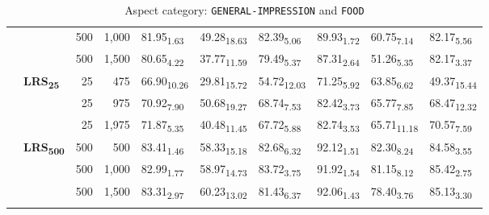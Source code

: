 \begin{table}[H]
\begin{subtable}{\linewidth}
{\begin{tabular}{llrrllllll}
 &  & 500 & 1,000 & 81.95\textsubscript{1.63} & 49.28\textsubscript{18.63} & 82.39\textsubscript{5.06} & 89.93\textsubscript{1.72} & 60.75\textsubscript{7.14} & 82.17\textsubscript{5.56} \\
 &  & 500 & 1,500 & 80.65\textsubscript{4.22} & 37.77\textsubscript{11.59} & 79.49\textsubscript{5.37} & 87.31\textsubscript{2.64} & 51.26\textsubscript{5.35} & 82.17\textsubscript{3.37} \\
\arrayrulecolor{gray}\cline{2-10}\arrayrulecolor{black}
\hline
\multirow{6}{*}{\textbf{GPT-3.5-turbo}} & \multirow{3}{*}{\textbf{LRS\textsubscript{25}}} & 25 & 475 & 66.90\textsubscript{10.26} & 29.81\textsubscript{15.72} & 54.72\textsubscript{12.03} & 71.25\textsubscript{5.92} & 63.85\textsubscript{6.62} & 49.37\textsubscript{15.44} \\
 &  & 25 & 975 & 70.92\textsubscript{7.90} & 50.68\textsubscript{19.27} & 68.74\textsubscript{7.53} & 82.42\textsubscript{3.73} & 65.77\textsubscript{7.85} & 68.47\textsubscript{12.32} \\
 &  & 25 & 1,975 & 71.87\textsubscript{5.35} & 40.48\textsubscript{11.45} & 67.72\textsubscript{5.88} & 82.74\textsubscript{3.53} & 65.71\textsubscript{11.18} & 70.57\textsubscript{7.59} \\
\arrayrulecolor{gray}\cline{2-10}\arrayrulecolor{black}
 & \multirow{3}{*}{\textbf{LRS\textsubscript{500}}} & 500 & 500 & 83.41\textsubscript{1.46} & 58.33\textsubscript{15.18} & 82.68\textsubscript{6.32} & 92.12\textsubscript{1.51} & 82.30\textsubscript{8.24} & 84.58\textsubscript{3.55} \\
 &  & 500 & 1,000 & 82.99\textsubscript{1.77} & 58.97\textsubscript{14.73} & 83.72\textsubscript{3.75} & 91.92\textsubscript{1.54} & 81.15\textsubscript{8.12} & 85.42\textsubscript{2.75} \\
 &  & 500 & 1,500 & 83.31\textsubscript{2.97} & 60.23\textsubscript{13.02} & 81.43\textsubscript{6.37} & 92.06\textsubscript{1.43} & 78.40\textsubscript{3.76} & 85.13\textsubscript{3.30} \\
\arrayrulecolor{gray}\cline{2-10}\arrayrulecolor{black}
\hline
\end{tabular}
}
\caption{Aspect category: \texttt{GENERAL-IMPRESSION} and \texttt{FOOD}}
\vspace{0.3cm}
\end{subtable}
\begin{subtable}{\linewidth}
\renewcommand{\arraystretch}{1.0}
\centering
{}
\end{subtable}
\end{table}
